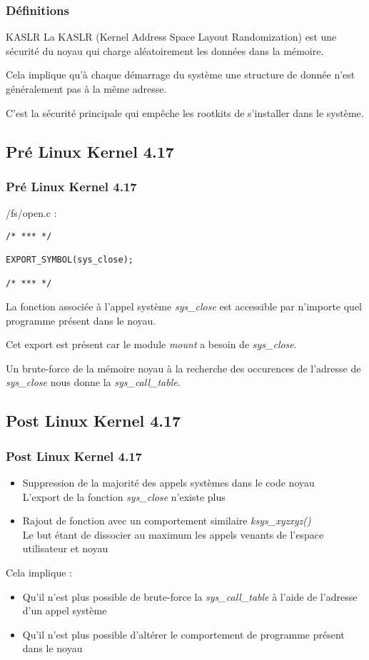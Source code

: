 \documentclass{beamer}
\begin{document}
\begin{frame}
\frametitle{Définitions}
\begin{block}{KASLR}
La KASLR (Kernel Address Space Layout Randomization) est une sécurité du noyau qui charge aléatoirement les données dans la mémoire.
\end{block}

Cela implique qu'à chaque démarrage du système une structure de donnée n'est généralement pas à la même adresse.

\medskip
C'est la sécurité principale qui empêche les rootkits de s'installer dans le système.
\end{frame}

\subsection{Pré Linux Kernel 4.17}

\begin{frame}[fragile]
\frametitle{Pré Linux Kernel 4.17}
/fs/open.c :
\begin{lstlisting}[style=CStyle]
/* *** */

EXPORT_SYMBOL(sys_close);

/* *** */
\end{lstlisting}
\medskip
La fonction associée à l'appel système \textit{sys\_close} est accessible par n'importe quel programme présent dans le noyau.

Cet export est présent car le module \textit{mount} a besoin de \textit{sys\_close}.

\medskip
Un brute-force de la mémoire noyau à la recherche des occurences de l'adresse de \textit{sys\_close} nous donne la \textit{sys\_call\_table}.
\end{frame}

\subsection{Post Linux Kernel 4.17}

\begin{frame}
\frametitle{Post Linux Kernel 4.17}
\begin{itemize}
\item 	Suppression de la majorité des appels systèmes dans le code noyau\\
	L'export de la fonction \textit{sys\_close} n'existe plus\\
\item 	Rajout de fonction avec un comportement similaire \textit{ksys\_xyzxyz()}\\
	Le but étant de dissocier au maximum les appels venants de l'espace utilisateur et noyau
\end{itemize}
Cela implique :
\begin{itemize}
\item 	Qu'il n'est plus possible de brute-force la \textit{sys\_call\_table} à l'aide de l'adresse d'un appel système
\item 	Qu'il n'est plus possible d'altérer le comportement de programme présent dans le noyau
\end{itemize}
\end{frame}
\end{document}
